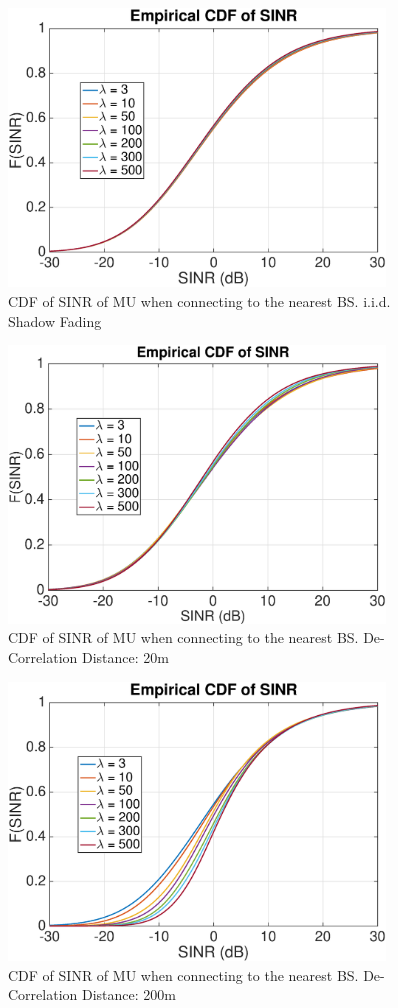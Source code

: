 \begin{figure}
 \centering
 \includegraphics[width=10cm]{NBMax1000OutageProbCDFiid.eps}
 \caption{CDF of SINR of MU when connecting to the nearest BS. i.i.d. Shadow Fading}
 \label{4:Mode1}
 \end{figure}
 \begin{figure}
 \centering
 \includegraphics[width=10cm]{NBMax1000OutageProbCDFDeCorr20.eps}
 \caption{CDF of SINR of MU when connecting to the nearest BS. De-Correlation Distance: 20m}
 \label{4:Mode2}
 \end{figure}
 \begin{figure}
 \centering
 \includegraphics[width=10cm]{NBMax1000OutageProbCDFDeCorr200.eps}
 \caption{CDF of SINR of MU when connecting to the nearest BS. De-Correlation Distance: 200m}
 \label{4:Mode3}
 \end{figure}


